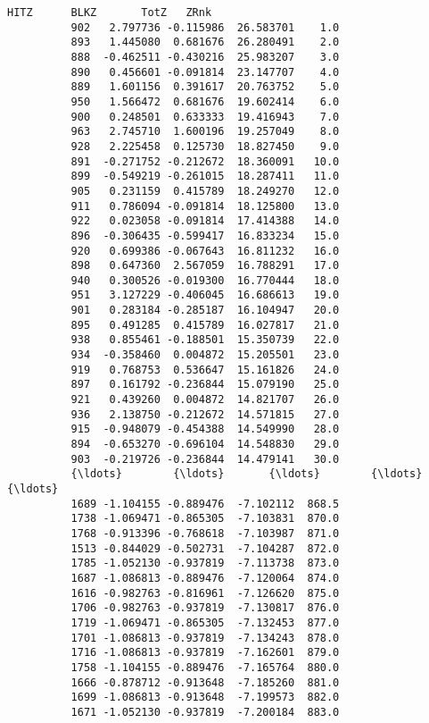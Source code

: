 \documentclass[11pt]{article}
\begin{document}
\begin{Verbatim}[commandchars=\\\{\}]
                    HITZ      BLKZ       TotZ   ZRnk  
          902   2.797736 -0.115986  26.583701    1.0  
          893   1.445080  0.681676  26.280491    2.0  
          888  -0.462511 -0.430216  25.983207    3.0  
          890   0.456601 -0.091814  23.147707    4.0  
          889   1.601156  0.391617  20.763752    5.0  
          950   1.566472  0.681676  19.602414    6.0  
          900   0.248501  0.633333  19.416943    7.0  
          963   2.745710  1.600196  19.257049    8.0  
          928   2.225458  0.125730  18.827450    9.0  
          891  -0.271752 -0.212672  18.360091   10.0  
          899  -0.549219 -0.261015  18.287411   11.0  
          905   0.231159  0.415789  18.249270   12.0  
          911   0.786094 -0.091814  18.125800   13.0  
          922   0.023058 -0.091814  17.414388   14.0  
          896  -0.306435 -0.599417  16.833234   15.0  
          920   0.699386 -0.067643  16.811232   16.0  
          898   0.647360  2.567059  16.788291   17.0  
          940   0.300526 -0.019300  16.770444   18.0  
          951   3.127229 -0.406045  16.686613   19.0  
          901   0.283184 -0.285187  16.104947   20.0  
          895   0.491285  0.415789  16.027817   21.0  
          938   0.855461 -0.188501  15.350739   22.0  
          934  -0.358460  0.004872  15.205501   23.0  
          919   0.768753  0.536647  15.161826   24.0  
          897   0.161792 -0.236844  15.079190   25.0  
          921   0.439260  0.004872  14.821707   26.0  
          936   2.138750 -0.212672  14.571815   27.0  
          915  -0.948079 -0.454388  14.549990   28.0  
          894  -0.653270 -0.696104  14.548830   29.0  
          903  -0.219726 -0.236844  14.479141   30.0  
          {\ldots}        {\ldots}       {\ldots}        {\ldots}    {\ldots}  
          1689 -1.104155 -0.889476  -7.102112  868.5  
          1738 -1.069471 -0.865305  -7.103831  870.0  
          1768 -0.913396 -0.768618  -7.103987  871.0  
          1513 -0.844029 -0.502731  -7.104287  872.0  
          1785 -1.052130 -0.937819  -7.113738  873.0  
          1687 -1.086813 -0.889476  -7.120064  874.0  
          1616 -0.982763 -0.816961  -7.126620  875.0  
          1706 -0.982763 -0.937819  -7.130817  876.0  
          1719 -1.069471 -0.865305  -7.132453  877.0  
          1701 -1.086813 -0.937819  -7.134243  878.0  
          1716 -1.086813 -0.937819  -7.162601  879.0  
          1758 -1.104155 -0.889476  -7.165764  880.0  
          1666 -0.878712 -0.913648  -7.185260  881.0  
          1699 -1.086813 -0.913648  -7.199573  882.0  
          1671 -1.052130 -0.937819  -7.200184  883.0  

\end{Verbatim}
\end{document}
